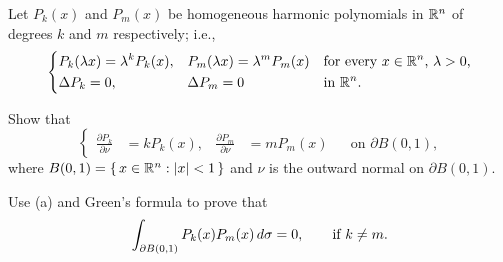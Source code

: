 \begin{problem}
  Let \(P_k(x)\) and \(P_m(x)\) be homogeneous harmonic polynomials in
  \(\mathbb{R}^n\) of degrees \(k\) and \(m\) respectively; i.e.,
  \[
    \left\{%
      \begin{aligned}
        &P_k(\lambda x)=\lambda^k P_k(x),%
        &&P_m(\lambda x)=\lambda^m P_m(x)%
        &&\text{for every \(x\in\R^n\), \(\lambda>0\),}\\
        &\Lap P_k=0,%
        &&\Lap P_m=0&&\text{in \(\R^n\).}
      \end{aligned}
    \right.
  \]
  \begin{alphlist}
  \item Show that
    \[
      \left\{%
        \begin{aligned}
          \frac{\partial P_k}{\partial \nu}&=kP_k(x),& \frac{\partial
            P_m}{\partial\nu}&=mP_m(x)&&\text{on \(\partial B(0,1)\),}
        \end{aligned}
      \right.
    \]
    where \(B(0,1)=\{\,x\in\mathbb{R}^n:|x|<1\,\}\) and \(\nu\) is the outward
    normal
    on \(\partial B(0,1)\).
  \item Use (a) and Green's formula to prove that
    \[
      \int_{\partial B(0,1)}P_k(x)P_m(x)\mathop{}\!d\sigma=0,\qquad\text{if
        \(k\neq m\).}
    \]
  \end{alphlist}
\end{problem}
